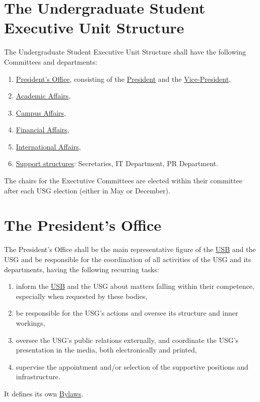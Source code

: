 \label{USGexecutiveUnitDef}

\section{The Undergraduate Student Executive Unit Structure} 
\label{USGstructure}
The Undergraduate Student Executive Unit Structure shall have the following Committees and departments:
\begin{enumerate}
\item \hyperref[PresidentOfficeDef]{President's Office}, consisting of the \hyperref[PresDef]{President} and the \hyperref[VPDef]{Vice-President},
\item \hyperref[AACdef]{Academic Affairs},
\item \hyperref[CACdef]{Campus Affairs},
\item \hyperref[Financesdef]{Financial Affairs},
\item \hyperref[IACdef]{International Affairs},
\item \hyperref[suppstrucdef]{Support structures}: Secretaries, IT Department, PR Department.
\end{enumerate}
The chairs for the Exectutive Committees are elected within their committee after each USG election (either in May or December).


\section{The President's Office} 
\label{PresidentOfficeDef}
The President's Office shall be the main representative figure of the \hyperref[studentbody]{USB} and the USG and be responsible for the coordination of all activities of the USG and its departments, having the following recurring tasks:
\begin{enumerate}
\item inform the \hyperref[studentbody]{USB} and the USG about matters falling within their competence, especially when requested by these bodies,
\item be responsible for the USG's actions and oversee its structure and inner workings,
\item oversee the USG's public relations externally, and coordinate the USG's presentation in the media, both electronically and printed,
\item supervise the appointment and/or selection of the supportive positions and infrastructure.
\end{enumerate}
It defines its own \hyperref[PresByLawsDef]{Bylaws}.

